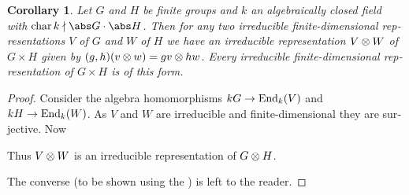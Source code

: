 \documentclass[12pt,a4paper]{scrartcl}
\theoremstyle{cplain}
\newtheorem{cor}[thmcounter]{Corollary}
\theoremstyle{cplain}
\theoremstyle{cplain}
\theoremstyle{definition}
\begin{document}
\begin{otherlanguage}{english}
\begin{cor}
  Let $G$ and $H$ be finite groups and $k$ an algebraically closed field with $\chr k \nmid \abs G \cdot \abs H$. Then for any two irreducible finite-dimensional representations $V$ of $G$ and $W$ of $H$ we have an irreducible representation $V \otimes W$ of $G \times H$ given by $(g,h)(v\otimes w) = gv \otimes hw$. Every irreducible finite-dimensional representation of $G\times H$ is of this form.
\end{cor}
\begin{proof}
  Consider the algebra homomorphisms $kG \to \operatorname{End}_k(V)$ and $kH \to \operatorname{End}_k(W)$. As $V$ and $W$ are irreducible and finite-dimensional they are surjective. Now
  \begin{center}
  \end{center}
  Thus $V \otimes W$ is an irreducible representation of $G \otimes H$. %
  
  The converse (to be shown using the ) is left to the reader.
\end{proof}


\end{otherlanguage}
\end{document}
